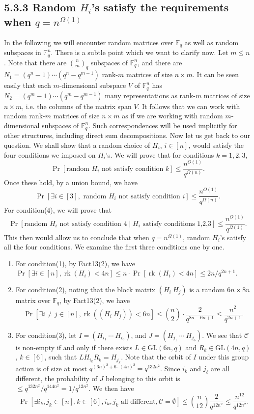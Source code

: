 \subsection*{5.3.3 Random $H_i$'s satisfy the requirements when $q=n^{\Omega(1)}$}
In the following we will encounter random matrices over $\mathbb F_q$ as well as random subspaces in $\mathbb F_q^n$. There is a subtle point which we want to clarify now. Let $m\le n$. Note that there are $\binom nm_q$ subspaces of $\mathbb F_q^n$, and there are $N_1=(q^n-1)\cdots(q^n-q^{m-1})$ rank-$m$ matrices of size $n\times m$. It can be seen easily that each $m$-dimensional subspace $V$ of $\mathbb F_q^n$ has $N_2=(q^m-1)\cdots(q^m-q^{m-1})$ many representations as rank-$m$ matrices of size $n\times m$, i.e. the columns of the matrix span $V$. It follows that we can work with random rank-$m$ matrices of size $n\times m$ as if we are working with random $m$-dimensional subspaces of $\mathbb F_q^n$. Such correspondences will be used implicitly for other structures, including direct sum decompositions.
Now let us get back to our question. We shall show that a random choice of $H_i$, $i\in[n]$, would satisfy the four conditions we imposed on $H_i$'s. We will prove that for conditions $k=1,2,3$,
\[\Pr[\text{random }H_i\text{ not satisfy condition }k]\le\frac{n^{O(1)}}{q^{\Omega(n)}}.\]
Once these hold, by a union bound, we have
\[\Pr[\exists i\in[3],\text{ random }H_i\text{ not satisfy condition }i]\le\frac{n^{O(1)}}{q^{\Omega(n)}}.\]
For condition(4), we will prove that
\[\Pr[\text{random }H_i\text{ not satisfy condition 4}\mid H_i\text{ satisfy conditions 1,2,3}]\le\frac{n^{O(1)}}{q^{\Omega(1)}}.\]
This then would allow us to conclude that when $q=n^{\Omega(1)}$, random $H_i$'s satisfy all the four conditions. We examine the first three conditions one by one.
\begin{enumerate}
\item For condition(1), by Fact13(2), we have $\Pr[\exists i\in[n],\operatorname{rk}(H_i)<4n]\le n\cdot\Pr[\operatorname{rk}(H_i)<4n]\le2n/q^{2n+1}$.
\item For condition(2), noting that the block matrix $(H_i\ H_j)$ is a random $6n\times8n$ matrix over $\mathbb F_q$, by Fact13(2), we have
\[\Pr[\exists i\ne j\in[n],\operatorname{rk}((H_i\ H_j))<6n]\le\binom n2\cdot\frac2{q^{8n-6n+1}}\le\frac{n^2}{q^{2n+1}}.\]
\item For condition(3), let $I=(H_{i_1}\ \cdots\ H_{i_6})$, and $J=(H_{j_1}\ \cdots\ H_{j_6})$. We see that $\mathcal C$ is non-empty if and only if there exists $L\in\mathrm{GL}(6n,q)$ and $R_k\in\mathrm{GL}(4n,q)$, $k\in[6]$, such that $LH_{i_k}R_k=H_{j_k}$. Note that the orbit of $I$ under this group action is of size at most $q^{(6n)^2+6\cdot(4n)^2}=q^{132n^2}$. Since $i_k$ and $j_\ell$ are all different, the probability of $J$ belonging to this orbit is $\le q^{132n^2}/q^{144n^2}=1/q^{12n^2}$. We then have
\[\Pr[\exists i_k,j_k\in[n],k\in[6],i_k,j_k\text{ all different},\mathcal C=\emptyset]\le\binom n{12}\frac2{q^{12n^2}}\le\frac{n^{12}}{q^{12n^2}}.\]
\end{enumerate}
